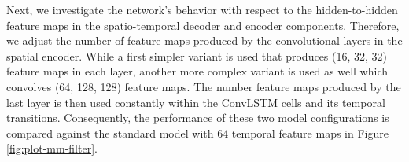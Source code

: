 Next, we investigate the network's behavior with respect to the hidden-to-hidden feature maps in the spatio-temporal decoder and encoder components. Therefore, we adjust the number of feature maps produced by the convolutional layers in the spatial encoder. While a first simpler variant is used that produces (16, 32, 32) feature maps in each layer, another more complex variant is used as well which convolves (64, 128, 128) feature maps. The number feature maps produced by the last layer is then used constantly within the ConvLSTM cells and its temporal transitions. Consequently, the performance of these two model configurations is compared against the standard model with 64 temporal feature maps in Figure \ref{fig:plot-mm-filter}.

\begin{figure}[htb]
\centering
\begin{subfigure}{0.5\textwidth}
  \centering
  \modelA
  \modelB
  \modelC
  \hspace*{-0.6cm}
  {
  }
\end{subfigure}
\end{figure}
